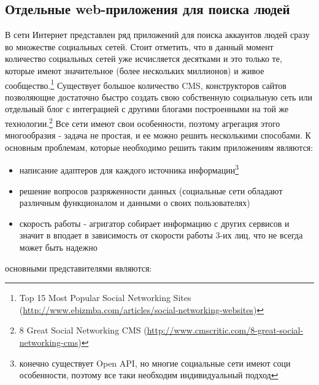 \begin{chap1}
\subsection{Отдельные web-приложения для поиска людей}
В сети Интернет представлен ряд приложений для поиска аккаунтов людей сразу во множестве социальных сетей. Стоит отметить, что в данный момент количество социальных сетей уже исчисляется десятками и это только те, которые имеют значительное (более нескольких миллионов) и живое сообщество.\footnote{Top 15 Most Popular Social Networking Sites (\url{http://www.ebizmba.com/articles/social-networking-websites})}
 Существует большое количество CMS,%
конструкторов сайтов позволяющие достаточно быстро создать свою собственную социальную сеть или отдельный блог с интеграцией с другими блогами построенными на той же технологии.\footnote{8 Great Social Networking CMS (\url{http://www.cmscritic.com/8-great-social-networking-cms})} 
Все сети имеют свои особенности,  поэтому агрегация этого многообразия - задача не простая, и ее можно решить несколькими способами. К основным проблемам, которые необходимо решить таким приложениям являются:
\begin{itemize}
\item написание адаптеров для каждого источника информации\footnote{конечно существует Open API, но многие социальные сети имеют соци особенности, поэтому все таки необходим индивидуальный подход}
\item решение вопросов разряженности данных (социальные сети обладают различным функционалом и данными о своих пользователях)
\item скорость работы - агригатор собирает информацию с других сервисов и значит в вподает в зависимость от скорости работы 3-их лиц, что не всегда может быть надежно
\end{itemize}

основными представителями являются:
\begin{itemize}


\end{itemize}
\end{chap1}
